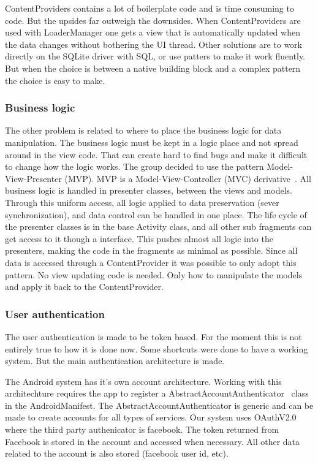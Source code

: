 ContentProviders contains a lot of boilerplate code and is time consuming to code. But the upsides far outweigh the downsides. When ContentProviders are used with LoaderManager one gets a view that is automatically updated when the data changes without bothering the UI thread. Other solutions are to work directly on the SQLite driver with SQL, or use patters to make it work fluently. But when the choice is between a native building block and a complex pattern the choice is easy to make. 

\subsubsection{Business logic}

The other problem is related to where to place the business logic for data manipulation. The business logic must be kept in a logic place and not spread around in the view code. That can create hard to find bugs and make it difficult to change how the logic works.
The group decided to use the pattern Model-View-Presenter (MVP). MVP is a Model-View-Controller (MVC) derivative~\cite{mvc}. All business logic is handled in presenter classes, between the views and models. Through this uniform access, all logic applied to data preservation (sever synchronization), and data control can be handled in one place. The life cycle of the presenter classes is in the base Activity class, and all other sub fragments can get access to it though a interface. 
This pushes almost all logic into the presenters, making the code in the fragments as minimal as possible. Since all data is accessed through a ContentProvider it was possible to only adopt this pattern. No view updating code is needed. Only how to manipulate the models and apply it back to the ContentProvider.


\subsubsection{User authentication}

The user authentication is made to be token based. For the moment this is not entirely true to how it is done now. Some shortcuts were done to have a working system. But the main authentication architecture is made.

The Android system has it's own account architecture. Working with this architechture requires the app to register a AbstractAccountAuthenticator~\cite{androidAccount} class in the AndroidManifest. The AbstractAccountAuthenticator is generic and can be made to create accounts for all types of services. Our system uses OAuthV2.0 where the third party authenicator is facebook. The token returned from Facebook is stored in the account and accessed when necessary. All other data related to the account is also stored (facebook user id, etc).

